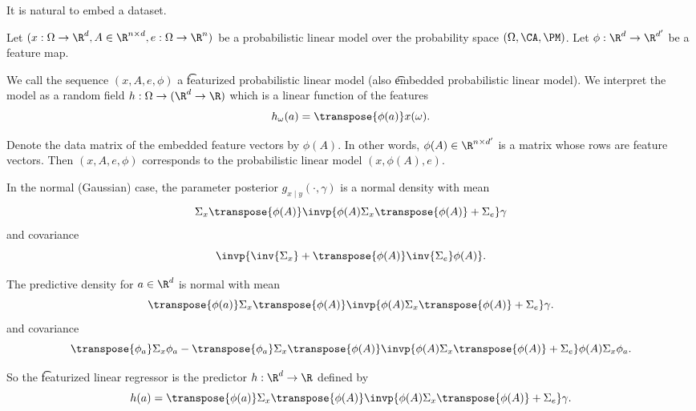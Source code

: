 

It is natural to embed a dataset.


Let $(x: \Omega \to \R^d, A \in \R^{n \times d}, e: \Omega \to \R^n)$ be a probabilistic linear model over the probability space $(\Omega, \CA, \PM)$.
Let $\phi: \R^d \to \R^{d'}$ be a feature map.

We call the sequence $(x, A, e, \phi)$ a \t{featurized probabilistic linear model} (also \t{embedded probabilistic linear model}).
We interpret the model as a random field $h: \Omega \to (\R^d \to \R)$ which is a linear function of the features
\[
  h_{\omega}(a) = \transpose{\phi(a)}x(\omega).
\]

Denote the data matrix of the embedded feature vectors by $\phi(A)$.
In other words, $\phi(A) \in \R^{n \times d'}$ is a matrix whose rows are feature vectors.
Then $(x, A, e, \phi)$ corresponds to the probabilistic linear model $(x, \phi(A), e)$.


In the normal (Gaussian) case, the parameter posterior $g_{x \mid y}(\cdot, \gamma)$ is a normal density with mean
\[
  \Sigma_{x}\transpose{\phi(A)}\invp{\phi(A)\Sigma_{x}\transpose{\phi(A)} + \Sigma_{e}} \gamma
\]
and covariance
\[
  \invp{\inv{\Sigma_{x}} + \transpose{\phi(A)}\inv{\Sigma_{e}}\phi(A)}.
\]

The predictive density for $a \in \R^d$ is normal with mean
\[
  \transpose{\phi(a)}\Sigma_{x}\transpose{\phi(A)}\invp{\phi(A)\Sigma_{x}\transpose{\phi(A)} + \Sigma_{e}}\gamma.
\]
and covariance
\[
  \transpose{\phi_a}\Sigma_{x}\phi_a - \transpose{\phi_a}\Sigma_{x}\transpose{\phi(A)}\invp{\phi(A)\Sigma_{x}\transpose{\phi(A)} + \Sigma_e}\phi(A)\Sigma_{x}\phi_a.
\]

So the \t{featurized linear regressor} is the predictor $h: \R^d \to \R$ defined by
\[
  h(a) = \transpose{\phi(a)}\Sigma_{x}\transpose{\phi(A)}\invp{\phi(A)\Sigma_{x}\transpose{\phi(A)} + \Sigma_{e}}\gamma.
\]

